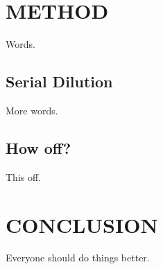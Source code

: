 \documentclass[aps,pre,twocolumn,nofootinbib,superscriptaddress,linenumbers]{revtex4-1}
\begin{document}
\section{METHOD}

Words.

%



\subsection*{Serial Dilution}

More words.

\subsection*{How off?}

This off.

\section{CONCLUSION}

Everyone should do things better.

\end{document}
